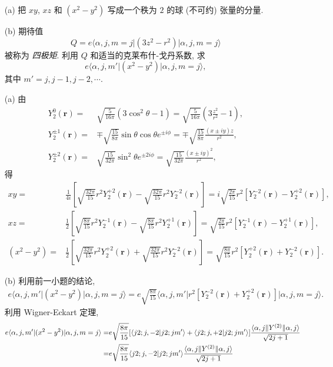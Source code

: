 \documentclass{assignment}
\begin{document}
\begin{prob}[课本习题 3.32]
    \begin{itemize}
        \item[(a)] 把 $xy$, $xz$ 和 $(x^2-y^2)$ 写成一个秩为 $2$ 的球 (不可约) 张量的分量.
        \item[(b)] 期待值
        \[
            Q=e\langle\alpha,j,m=j\rvert(3z^2-r^2)\lvert\alpha,j,m=j\rangle
        \]
        被称为 \textit{四极矩}. 利用 $Q$ 和适当的克莱布什-戈丹系数, 求
        \[
            e\langle\alpha,j,m'\rvert(x^2-y^2)\lvert\alpha,j,m=j\rangle,
        \]
        其中 $m'=j,j-1,j-2,\cdots$.
    \end{itemize}
\end{prob}
\begin{sol}
    \begin{itemize}
        \item[(a)] 由
        \begin{align}
            Y_2^0(\bm{r})=&\sqrt{\frac{5}{16\pi}}(3\cos^2\theta-1)=\sqrt{\frac{5}{16\pi}}\left(3\frac{z^2}{r^2}-1\right),\\
            Y_2^{\pm 1}(\bm{r})=&\mp\sqrt{\frac{15}{8\pi}}\sin\theta\cos\theta e^{\pm i\phi}=\mp\sqrt{\frac{15}{8\pi}}\frac{(x\pm iy)z}{r^2},\\
            Y_2^{\pm 2}(\bm{r})=&\sqrt{\frac{15}{32\pi}}\sin^2\theta e^{\pm 2i\phi}=\sqrt{\frac{15}{32\pi}}\frac{(x\pm iy)^2}{r^2},
        \end{align}
        得
        \begin{align}
            xy=&\frac{1}{4i}\left[\sqrt{\frac{32\pi}{15}}r^2Y_2^{+2}(\bm{r})-\sqrt{\frac{32\pi}{15}}r^2Y_2^{-2}(\bm{r})\right]=i\sqrt{\frac{2\pi}{15}}r^2[Y_2^{-2}(\bm{r})-Y_2^{+2}(\bm{r})],\\
            xz=&\frac{1}{2}\left[\sqrt{\frac{8\pi}{15}}r^2Y_2^{-1}(\bm{r})-\sqrt{\frac{8\pi}{15}}r^2Y_2^{+1}(\bm{r})\right]=\sqrt{\frac{2\pi}{15}}r^2[Y_2^{-1}(\bm{r})-Y_2^{+1}(\bm{r})],\\
            (x^2-y^2)=&\frac{1}{2}\left[\sqrt{\frac{32\pi}{15}}r^2Y_2^{+2}(\bm{r})+\sqrt{\frac{32\pi}{15}}r^2Y_2^{-2}(\bm{r})\right]=\sqrt{\frac{8\pi}{15}}r^2[Y_2^{+2}(\bm{r})+Y_2^{-2}(\bm{r})].
        \end{align}
        \item[(b)] 利用前一小题的结论,
        \begin{align}
            e\langle\alpha,j,m'\rvert(x^2-y^2)\lvert\alpha,j,m=j\rangle=e\sqrt{\frac{8\pi}{15}}\langle\alpha,j,m'\rvert r^2[Y_2^{-2}(\bm{r})+Y_2^{+2}(\bm{r})]\lvert\alpha,j,m=j\rangle.
        \end{align}
        利用 Wigner-Eckart 定理,
        \begin{align}
            \notag e\langle\alpha,j,m'\rvert(x^2-y^2)\lvert\alpha,j,m=j\rangle=&e\sqrt{\frac{8\pi}{15}}[\langle j2;j,-2\vert j2;jm'\rangle+\langle j2;j,+2\vert j2;jm'\rangle]\frac{\langle\alpha,j\rVert Y^{(2)}\lVert\alpha,j\rangle}{\sqrt{2j+1}}\\
            =&e\sqrt{\frac{8\pi}{15}}\langle j2;j,-2\vert j2;jm'\rangle\frac{\langle\alpha,j\rVert Y^{(2)}\lVert\alpha,j\rangle}{\sqrt{2j+1}}
        \end{align}


\end{itemize}
\end{sol}
\end{document}
